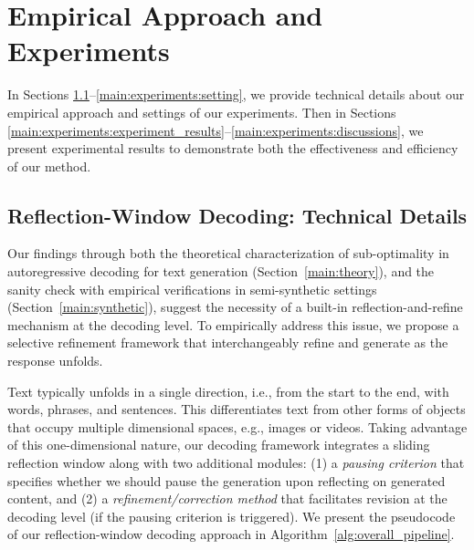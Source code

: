 
\section{Empirical Approach and Experiments}\label{main:experiments}
In Sections \ref{main:experiments:technical_approach}--\ref{main:experiments:setting}, we provide technical details about our empirical approach and settings of our experiments.
Then in Sections \ref{main:experiments:experiment_results}--\ref{main:experiments:discussions}, we present experimental results to demonstrate both the effectiveness and efficiency of our method.


\subsection{Reflection-Window Decoding: Technical Details}\label{main:experiments:technical_approach}
Our findings through both the theoretical characterization of sub-optimality in autoregressive decoding for text generation (Section~\ref{main:theory}), and the sanity check with empirical verifications in semi-synthetic settings (Section~\ref{main:synthetic}), suggest the necessity of a built-in reflection-and-refine mechanism at the decoding level.
To empirically address this issue, we propose a selective refinement framework that interchangeably refine and generate as the response unfolds.

Text typically unfolds in a single direction, i.e., from the start to the end, with words, phrases, and sentences.
This differentiates text from other forms of objects that occupy multiple dimensional spaces, e.g., images or videos.
Taking advantage of this one-dimensional nature, our decoding framework integrates a sliding reflection window along with two additional modules: (1) a \emph{pausing criterion} that specifies whether we should pause the generation upon reflecting on generated content, and (2) a \emph{refinement/correction method} that facilitates revision at the decoding level (if the pausing criterion is triggered).
We present the pseudocode of our reflection-window decoding approach in Algorithm~\ref{alg:overall_pipeline}.

